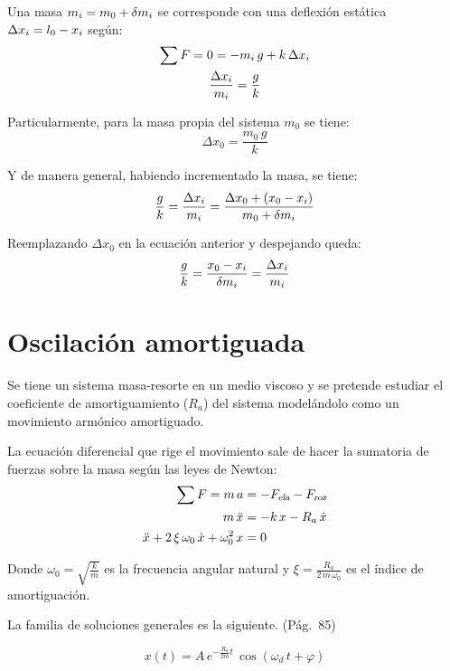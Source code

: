 \documentclass[a5paper,12pt,twoside]{book}
\begin{document}
Una masa $m_i = m_0+\delta m_i$ se corresponde con una deflexión estática $\Delta x_i = l_0 - x_i$ según:
\begin{gather*}
    \sum F = 0 = -m_i \, g + k \, \Delta x_i
    \\
    \frac{\Delta x_i}{m_i} = \frac{g}{k}
\end{gather*}

Particularmente, para la masa propia del sistema $m_0$ se tiene:
\begin{equation*}
    \Delta x_0 = \frac{m_0 \, g}{k}
\end{equation*}

Y de manera general, habiendo incrementado la masa, se tiene:
\begin{equation*}
    \frac{g}{k} = \frac{\Delta x_i}{m_i} = \frac{\Delta x_0 + (x_0-x_i)}{m_0 + \delta m_i}
\end{equation*}

Reemplazando $\Delta x_0$ en la ecuación anterior y despejando queda:
\begin{equation*}
    \frac{g}{k} = \frac{x_0 - x_i}{\delta m_i} = \frac{\Delta x_i}{m_i}
\end{equation*}


\section{Oscilación amortiguada}

Se tiene un sistema masa-resorte en un medio viscoso y se pretende estudiar el coeficiente de amortiguamiento ($R_a$) del sistema modelándolo como un movimiento armónico amortiguado.

La ecuación diferencial que rige el movimiento sale de hacer la sumatoria de fuerzas sobre la masa según las leyes de Newton:
\begin{align*}
    \sum F = m \, a &= -{{F}_\textsl{{ela}}} - {{F}_\textsl{{roz}}}
    \\
    m \, \ddot{x} &= -k \, x - R_a \, \dot{x}
    \\
    \ddot{x} + 2 \, \xi \, \omega_0 \, \dot{x} + \omega_0^2 \, x &= 0
\end{align*}

Donde $\omega_0=\sqrt{\frac{k}{m}}$ es la frecuencia angular natural y $\xi=\frac{R_a}{2 \, m \, \omega_0}$ es el índice de amortiguación.

La familia de soluciones generales es la siguiente. \cite{1} (Pág.~85)

\begin{equation}
    x(t)=A\,e^{-\tfrac{R_a}{2m}t} \, \cos (\omega_d\,t+\varphi)
    \label{eqn:MAA}
\end{equation}
\end{document}
